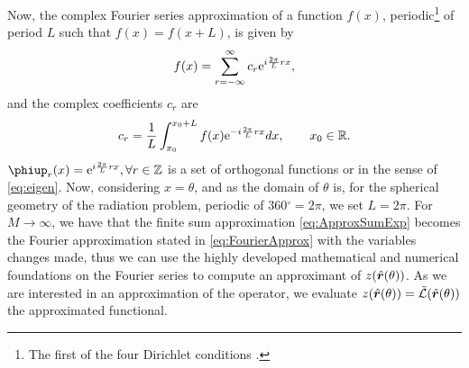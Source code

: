 \par Now, the complex Fourier series approximation of a function $f(x)$, periodic\footnote{The first of the four Dirichlet conditions \cite{RileyHobsonBenceMMPE}.} of period $L$ such that $f(x) = f(x+L)$, is given by
\begin{equation}
\label{eq:FourierApprox}
f(x) = \sum_{r=-\infty}^{\infty} c_r \mathrm{e}^{i \frac{2\pi}{L} r x},
\end{equation}
and the complex coefficients $c_r$ are
\begin{equation}
\label{eq:coeffsCr}
c_r = \frac{1}{L} \int_{x_0}^{x_0+ L} f(x) \mathrm{e}^{- i \frac{2\pi}{L} r x} dx,  \qquad x_0 \in \mathbb{R}.
\end{equation} $\phiup_r(x) = \mrm{e}^{i \frac{2\pi}{L} r x}, \forall r \in \mathbb{Z}$ is a set of orthogonal functions or  in the sense of \eqref{eq:eigen}.
Now, considering $x = \theta$, and as the domain of $\theta$ is, for the spherical geometry of the radiation problem, periodic of $360 \ensuremath{^\circ} = 2 \pi$, we set $L = 2 \pi$. For $M \to \infty$, we have that the finite sum approximation \eqref{eq:ApproxSumExp} becomes the Fourier approximation stated in \eqref{eq:FourierApprox} with the variables changes made, thus we can use the highly developed mathematical and numerical foundations on the Fourier series to compute an approximant of $z(\hat{\mbfit{r}}(\theta))$. As we are interested in an approximation of the operator, we evaluate $z(\hat{\mbfit{r}}(\theta)) = \tilde{\mathcal{L}}(\hat{\mbfit{r}}(\theta))$ the approximated functional.

